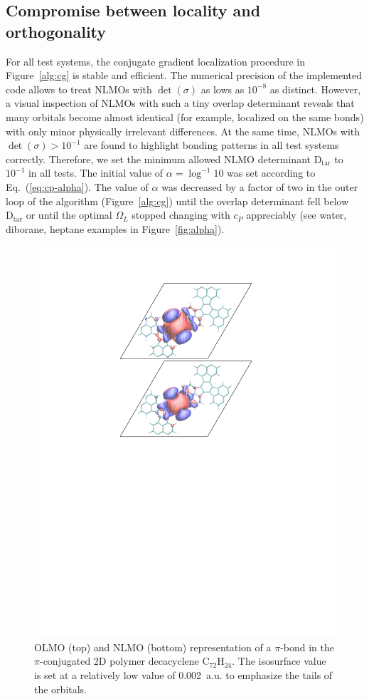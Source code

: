 \documentclass[aps,prl,reprint,amsmath,amssymb]{revtex4-1}
\begin{document}
\subsection{Compromise between locality and orthogonality}

For all test systems, the conjugate gradient localization procedure in Figure~\ref{alg:cg} is stable and efficient. The numerical precision of the implemented code allows to treat NLMOs with $\det(\sigma)$ as lows as $10^{-8}$ as distinct. However, a visual inspection of NLMOs with such a tiny overlap determinant reveals that many orbitals become almost identical (for example, localized on the same bonds) with only minor physically irrelevant differences. At the same time, NLMOs with $\det(\sigma) > 10^{-1}$ are found to highlight bonding patterns in all test systems correctly. Therefore, we set the minimum allowed NLMO determinant $\text{D}_{\text{tar}}$ to $10^{-1}$ in all tests. The initial value of $\alpha=\log^{-1} 10$ was set according to Eq.~(\ref{eq:cp-alpha}). The value of $\alpha$ was decreased by a factor of two in the outer loop of the algorithm (Figure~\ref{alg:cg}) until the overlap determinant fell below $\text{D}_{\text{tar}}$ or until the optimal $\Omega_{L}$ stopped changing with $c_P$ appreciably (see water, diborane, heptane examples in Figure~\ref{fig:alpha}).
%
\begin{figure}[htbp]
\includegraphics[scale=0.8]{C72H24.pdf} 
  \caption{OLMO (top) and NLMO (bottom) representation of a $\pi$-bond in the $\pi$-conjugated 2D polymer decacyclene C$_{72}$H$_{24}$. The isosurface value is set at a relatively low value of 0.002~a.u. to emphasize the tails of the orbitals.}
\label{fig:decacyclene}
\end{figure}
%
\end{document}
